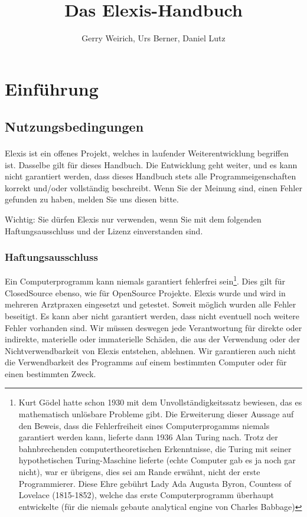 \documentclass[paper=a4,BCOR8.25mm,twoside]{scrbook}
\author{Gerry Weirich, Urs Berner, Daniel Lutz}
\title{Das Elexis\textsuperscript{\textregistered}-Handbuch}
\begin{document}
\maketitle
%
\tableofcontents
\part{Einführung}
\chapter{Nutzungsbedingungen}
Elexis\textsuperscript{\textregistered} ist ein offenes Projekt, welches in laufender Weiterentwicklung begriffen ist. Dasselbe gilt für dieses Handbuch.
Die Entwicklung geht weiter, und es kann nicht garantiert werden, dass dieses Handbuch stets alle Programmeigenschaften korrekt und/oder vollständig beschreibt. Wenn Sie der Meinung sind, einen Fehler gefunden zu haben, melden Sie uns diesen bitte.

Wichtig: Sie dürfen Elexis nur verwenden, wenn Sie mit dem folgenden Haftungsausschluss und der Lizenz einverstanden sind.

\section{Haftungsausschluss}
Ein Computerprogramm kann niemals garantiert fehlerfrei sein\footnote{Kurt Gödel hatte schon 1930 mit dem Unvollständigkeitssatz bewiesen, das es mathematisch unlösbare Probleme gibt. Die Erweiterung dieser Aussage auf den Beweis, dass die Fehlerfreiheit eines Computerprogamms niemals garantiert werden kann, lieferte dann 1936 Alan Turing nach. Trotz der bahnbrechenden computertheoretischen Erkenntnisse, die Turing mit seiner hypothetischen Turing-Maschine lieferte (echte Computer gab es ja noch gar nicht), war er übrigens, dies sei am Rande erwähnt, nicht der erste Programmierer. Diese Ehre gebührt Lady Ada Augusta Byron, Countess of Lovelace (1815-1852), welche das erste Computerprogramm überhaupt entwickelte (für die niemals gebaute analytical engine von Charles Babbage)}. Dies gilt für ClosedSource ebenso, wie für OpenSource Projekte. Elexis wurde und wird in mehreren Arztpraxen eingesetzt und getestet. Soweit möglich wurden alle Fehler beseitigt. Es kann aber nicht garantiert werden, dass nicht eventuell noch weitere Fehler vorhanden sind. Wir müssen deswegen jede Verantwortung für direkte oder indirekte, materielle oder immaterielle Schäden, die aus der Verwendung oder der Nichtverwendbarkeit von Elexis entstehen, ablehnen. Wir garantieren auch nicht die Verwendbarkeit des Programms auf einem bestimmten Computer oder für einen bestimmten Zweck. 
\end{document}
